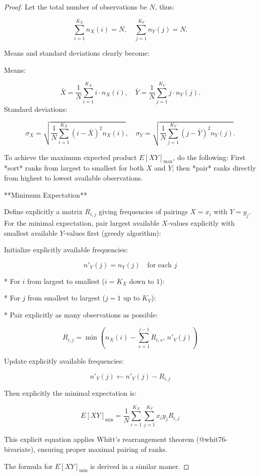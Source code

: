 \documentclass[
  12pt,
]{article}
\begin{document}
\begin{proof}

Let the total number of observations be $N$, thus:

$$\sum_{i=1}^{K_X} n_{X}(i) = N,\quad \sum_{j=1}^{K_Y} n_{Y}(j) = N.$$

Means and standard deviations clearly become:

Means:
    
$$
\bar{X} = \frac{1}{N}\sum_{i=1}^{K_X} i \cdot n_X(i),\quad  
    \bar{Y} = \frac{1}{N}\sum_{j=1}^{K_Y} j \cdot n_Y(j).
$$
Standard deviations:
    
$$
\sigma_X = \sqrt{\frac{1}{N}\sum_{i=1}^{K_X} (i - \bar{X})^2 n_X(i)},\quad  
    \sigma_Y = \sqrt{\frac{1}{N}\sum_{j=1}^{K_Y} (j - \bar{Y})^2 n_Y(j)}.
$$


To achieve the maximum expected product $E[XY]_{\text{max}}$, do the following:
First *sort* ranks from largest to smallest for both $X$ and $Y$; then *pair* ranks directly from highest to lowest available observations.
    




**Minimum Expectation**
  

Define explicitly a matrix $R_{i,j}$ giving frequencies of pairings $X=x_i$ with $Y=y_j$. For the minimal expectation, pair largest available $X$-values explicitly with smallest available $Y$-values first (greedy algorithm):

Initialize explicitly available frequencies:
    

$$n'_Y(j)=n_Y(j)\quad\text{for each }j$$

* For $i$ from largest to smallest ($i=K_X$ down to $1$):
    
    * For $j$ from smallest to largest ($j=1$ up to $K_Y$):
        
        * Pair explicitly as many observations as possible:
            

$$R_{i,j}=\min\left(n_X(i)-\sum_{s=1}^{j-1}R_{i,s},\, n'_Y(j)\right)$$

Update explicitly available frequencies:


$$n'_Y(j)\leftarrow n'_Y(j)-R_{i,j}$$

Then explicitly the minimal expectation is:

$$E[XY]_{\text{min}}=\frac{1}{N}\sum_{i=1}^{K_X}\sum_{j=1}^{K_Y} x_i y_j R_{i,j}$$

  

This explicit equation applies Whitt’s rearrangement theorem (@whit76-bivariate),  ensuring proper maximal pairing of ranks.

The formula for $E[XY]_{\text{min}}$ is derived in a similar maner.

\end{proof}
\end{document}
